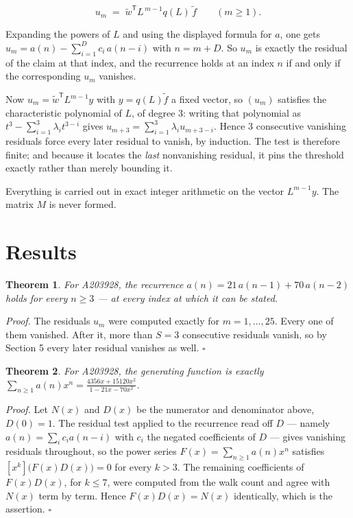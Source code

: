 \documentclass[11pt]{article}
\newtheorem{theorem}{Theorem}
\theoremstyle{definition}
\begin{document}
\[u_m \;=\; \tilde w^{\mathsf T} L^{\,m-1} q(L)\,\tilde f \qquad (m \ge 1).\]

Expanding the powers of $L$ and using the displayed formula for $a$, one gets $u_m = a(n) - \sum_{i=1}^{D} c_i\,a(n-i)$ with $n = m + D$. So $u_m$ is exactly the residual of the claim at that index, and the recurrence holds at an index $n$ if and only if the corresponding $u_m$ vanishes.

Now $u_m = \tilde w^{\mathsf T} L^{m-1} y$ with $y = q(L)\tilde f$ a fixed vector, so $(u_m)$ satisfies the characteristic polynomial of $L$, of degree $3$: writing that polynomial as $t^{3} - \sum_{i=1}^{3} \lambda_i t^{3-i}$ gives $u_{m+3} = \sum_{i=1}^{3} \lambda_i u_{m+3-i}$. Hence $3$ consecutive vanishing residuals force every later residual to vanish, by induction. The test is therefore finite; and because it locates the {\itshape last} nonvanishing residual, it pins the threshold exactly rather than merely bounding it.

Everything is carried out in exact integer arithmetic on the vector $L^{m-1}y$. The matrix $M$ is never formed.

\section{Results}

\begin{theorem} For A203928, the recurrence $a(n) = 21\,a(n-1) + 70\,a(n-2)$ holds for every $n \ge 3$ --- at every index at which it can be stated.\end{theorem}

{\itshape Proof.} The residuals $u_m$ were computed exactly for $m = 1,\dots,25$. Every one of them vanished. After it, more than $S = 3$ consecutive residuals vanish, so by Section 5 every later residual vanishes as well. $\square$

\begin{theorem} For A203928, the generating function is exactly $\sum_{n\ge 1} a(n)x^n = \frac{4356x + 15120x^{2}}{1 - 21x - 70x^{2}}$.\end{theorem}

{\itshape Proof.} Let $N(x)$ and $D(x)$ be the numerator and denominator above, $D(0)=1$. The residual test applied to the recurrence read off $D$ --- namely $a(n) = \sum_i c_i a(n-i)$ with $c_i$ the negated coefficients of $D$ --- gives vanishing residuals throughout, so the power series $F(x)=\sum_{n\ge 1}a(n)x^n$ satisfies $[x^k]\bigl(F(x)D(x)\bigr) = 0$ for every $k > 3$. The remaining coefficients of $F(x)D(x)$, for $k \le 7$, were computed from the walk count and agree with $N(x)$ term by term. Hence $F(x)D(x) = N(x)$ identically, which is the assertion. $\square$
\end{document}
